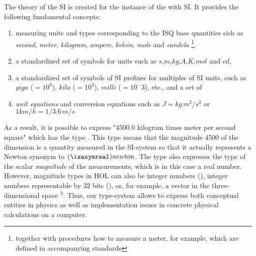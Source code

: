 \documentclass[11pt,a4paper]{book}
\begin{document}
The theory of the SI is created for the instance of the  with SI.
It provides the following fundamental concepts:
\begin{enumerate}%
\item measuring units and types corresponding to the ISQ base quantities sich
      as \emph{second}, \emph{meter}, \emph{kilogram}, \emph{ampere}, \emph{kelvin}, \emph{mole} and
      \emph{candela} \footnote{together with procedures how to measure a meter, for example, which are
      defined in accompanying standards},
\item a standardized set of symbols for units such as $s$,$m$,$kg$,$A$,$K$,$mol$ and $cd$,
\item a standardized set of symbols of SI prefixes for multiples of SI units, such as 
      $giga$ ($=10^9$), $kilo$ ($=10^3$), $milli$ ($=10^-3$), etc., and a set of
\item \emph{unit equations} and conversion equations such as $J = kg\,m^2/s^2$ or $1 km/h = 1/3.6\,m/s$

\end{enumerate}

As a result, it is possible to express "4500.0 kilogram times meter per second square" which has 
the type 
. 
This type means that the magnitude $4500$ of the dimension 
 is a quantity measured in the SI-system so that it actually
represents a Newton synonym to $(\isasymreal)newton$.
 The type also expresses the type of the scalar \emph{magnitude} of the 
measurements, which is in this case a real number. However, magnitude types in HOL can also be 
integer numbers (), integer numbers representable by 32 bits (), or, for example,
a vector in the three-dimensional space  \isa{\isasymreal}$^3$. Thus, our type-system allows
to express both conceptual entities in physics as well as 
implementation issues in concrete physical calculations on a computer.
\end{document}
